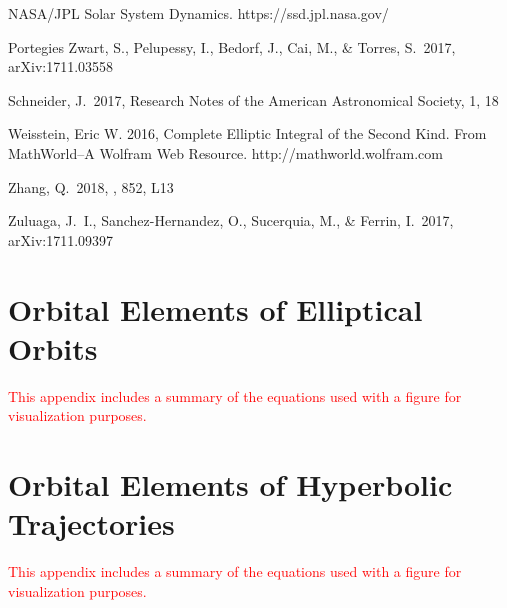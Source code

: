 \documentclass[a4paper,fleqn,usenatbib]{mnras}
\newcommand{\fix}{\textcolor{red}}
\begin{document}
\begin{thebibliography}{99}
 NASA/JPL Solar System Dynamics. https://ssd.jpl.nasa.gov/

 Portegies Zwart, S., Pelupessy, I., Bedorf, J., Cai, M., \& Torres, S.\ 2017, arXiv:1711.03558

 Schneider, J.\ 2017, Research Notes of the American Astronomical Society, 1, 18

 Weisstein, Eric W. 2016, Complete Elliptic Integral of the Second Kind. From MathWorld--A Wolfram Web Resource. http://mathworld.wolfram.com

 Zhang, Q.\ 2018, \apjl, 852, L13

 Zuluaga, J.~I., Sanchez-Hernandez, O., Sucerquia, M., \& Ferrin, I.\ 2017, arXiv:1711.09397

\end{thebibliography}



\appendix

\section{Orbital Elements of Elliptical Orbits}

\fix{This appendix includes a summary of the equations used with a figure for visualization purposes.}

\section{Orbital Elements of Hyperbolic Trajectories}

\fix{This appendix includes a summary of the equations used with a figure for visualization purposes.}


\bsp	%
\label{lastpage}
\end{document}
